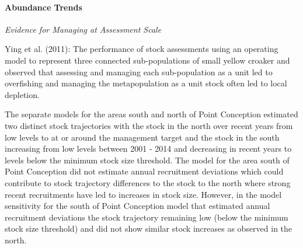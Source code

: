 \documentclass[11pt,
  english,
  a4paper,
]{article}
\begin{document}
\leavevmode\tagmcend\tagstructend


\hypertarget{abundance-trends}{%
\paragraph{Abundance Trends}\label{abundance-trends}}

\leavevmode\tagmcend\tagstructend


\emph{Evidence for Managing at Assessment Scale}

\leavevmode\tagmcend\tagstructend\par


Ying et al. {(2011)\leavevmode\tagmcend\tagstructend}: The performance of stock assessments using an operating model to represent three connected sub-populations of small yellow croaker and observed that assessing and managing each sub-population as a unit led to overfishing and managing the metapopulation as a unit stock often led to local depletion.

\leavevmode\tagmcend\tagstructend\par


The separate models for the areas south and north of Point Conception estimated two distinct stock trajectories with the stock in the north over recent years from low levels to at or around the management target and the stock in the south increasing from low levels between 2001 - 2014 and decreasing in recent years to levels below the minimum stock size threshold. The model for the area south of Point Conception did not estimate annual recruitment deviations which could contribute to stock trajectory differences to the stock to the north where strong recent recruitments have led to increases in stock size. However, in the model sensitivity for the south of Point Conception model that estimated annual recruitment deviations the stock trajectory remaining low (below the minimum stock size threshold) and did not show similar stock increases as observed in the north.

\leavevmode\tagmcend\tagstructend\par

\end{document}
